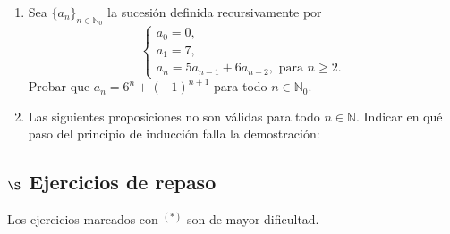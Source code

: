 \documentclass[a4paper,12pt,twoside,spanish,reqno]{amsbook}
\numberwithin{equation}{section}
\begin{document}
\begin{enumerate}
\item Sea $\{a_n\}_{n\in\mathbb N_0}$ la sucesi\'on definida recursivamente por
$$\begin{cases}
   a_0=0, \\a_1=7, \\a_{n} = 5a_{n-1}+6a_{n-2}, \text{ para $n\geq 2$}.
  \end{cases}$$
Probar que $a_n=6^n + (-1)^{n+1}$ para todo $n\in \mathbb N_0$.

\item Las siguientes proposiciones no son válidas para todo $n \in {\mathbb N}$. Indicar en qué paso del principio de inducción falla la demostración:
\end{enumerate}

\subsection*{$\S$ Ejercicios de repaso} Los ejercicios marcados con ${}^{(*)}$ son de mayor dificultad.
\end{document}

